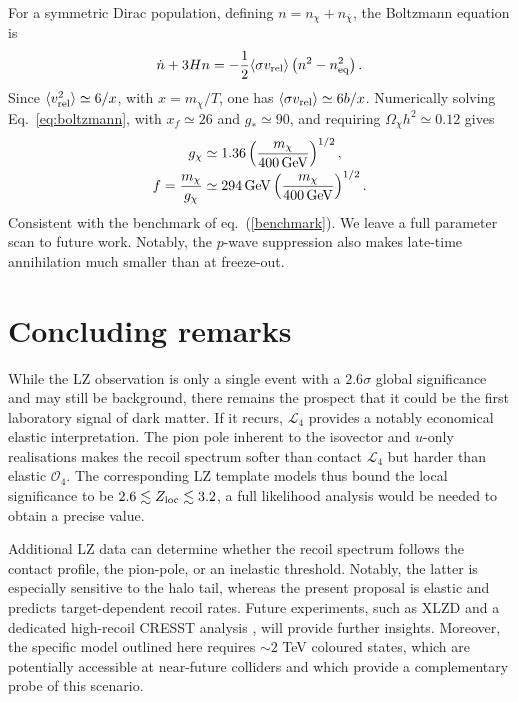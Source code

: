 \documentclass[notitlepage,floats,aps,nofootinbib,preprintnumbers,twocolumn,prl,10pt,balancelastpage]{revtex4-1}
\newcommand{\Lag}{\mathcal L}
\newcommand{\Ocal}{\mathcal O}
\begin{document}
For a symmetric Dirac population, defining
$n=n_\chi+n_{\bar\chi}$, the Boltzmann equation is
\begin{equation}
 \dot n+3Hn
 =-\frac{1}{2}\langle\sigma v_{\rm rel}\rangle
 \left(n^2-n_{\rm eq}^2\right).
 \label{eq:boltzmann}
\end{equation}
 Since
$\langle v_{\rm rel}^2\rangle\simeq6/x$, with
$x=m_\chi/T$, one has
$\langle\sigma v_{\rm rel}\rangle\simeq6b/x$.  Numerically solving
Eq.~\eqref{eq:boltzmann}, with $x_f\simeq26$ and
$g_*\simeq90$, and requiring $\Omega_\chi h^2\simeq0.12$ gives
\begin{equation}
 \begin{aligned}
 g_\chi&\simeq1.36
 \left(\frac{m_\chi}{400\,{\rm GeV}}\right)^{1/2},
 \nonumber\\[-2pt]
 f=\frac{m_\chi}{g_\chi}
 &\simeq294\,{\rm GeV}
 \left(\frac{m_\chi}{400\,{\rm GeV}}\right)^{1/2}.
 \end{aligned}
 \label{eq:thermal}
\end{equation}
Consistent with the benchmark of eq.~(\ref{benchmark}). We leave a full parameter scan to future work.
Notably, the $p$-wave suppression also makes
late-time annihilation much smaller than at freeze-out.


\section{Concluding remarks}
\vspace{-3mm}


While the LZ observation is only a single event with a $2.6\sigma$ global significance and
may still be background, there remains the prospect that it could be the first laboratory signal of dark matter.
%
  If it recurs, $\Lag_4$ provides a notably economical
elastic interpretation.  
%
The pion pole inherent to the isovector and $u$-only realisations makes the recoil
spectrum softer than contact $\Lag_4$ but harder than elastic $\Ocal_4$.
The corresponding LZ template models  \cite{LZ:2026axp} thus bound the local significance to be
$2.6\lesssim Z_{\rm loc}\lesssim3.2$, a full likelihood analysis would be needed to obtain a precise value.

Additional LZ data can determine whether the recoil spectrum follows the
 contact profile, the pion-pole, or an inelastic threshold.  Notably, the latter is especially sensitive to the halo
tail, whereas the present proposal is elastic and predicts target-dependent recoil rates. 
Future experiments, such as XLZD  \cite{XLZD:2024nsu} and a dedicated high-recoil CRESST analysis  \cite{Angloher:2025fzw}, will
provide further insights. Moreover, the specific model outlined here requires $\sim2$ TeV coloured states, which are potentially accessible at near-future colliders and which provide a complementary probe of this scenario.
\end{document}
